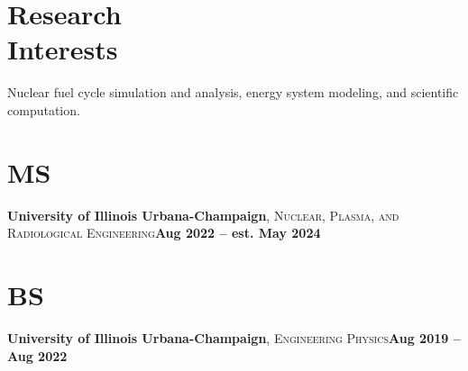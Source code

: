 \documentclass[margin,line]{resume}
\begin{document}
\begin{resume}
    \section{\mysidestyle Research\\Interests}
                Nuclear fuel cycle simulation and analysis,
                energy system modeling, and
                scientific computation.
    \section{\mysidestyle MS}
    \textbf{University of Illinois Urbana-Champaign}, \textsc{Nuclear, Plasma, and Radiological Engineering}\hfill\textbf{Aug 2022 -- est. May 2024}\vspace{-3mm}\\\vspace{-1mm}%
    \vspace{-1.5mm}
    \section{\mysidestyle BS}
    \textbf{University of Illinois Urbana-Champaign}, \textsc{Engineering Physics}\hfill\textbf{Aug 2019 -- Aug 2022}\vspace{-3mm}\\\vspace{-1mm}%
    \vspace{-1.5mm}

\end{resume}
\end{document}
